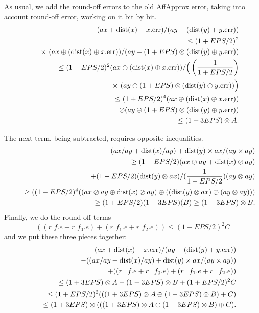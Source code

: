 As usual, we add the round-off errors to the old AffApprox error, 
taking into account round-off error, working on it bit by bit.
\begin{eqnarray*}
 &&\hskip-16pt (ax + {\rm dist}(x) + x.{\rm err})/(ay - ({\rm dist}(y) + y.{\rm err}))\\
&&  \le (1 + EPS/2)^2 \\
&&\quad \times \ (ax \oplus ({\rm dist}(x)
\oplus x.{\rm err}))/
         (ay - (1 + EPS) \otimes ({\rm dist}(y) \oplus y.{\rm err}))\\
&&  \le (1 + EPS/2)^2 (ax \oplus ({\rm dist}(x) \oplus
x.{\rm err}))/
         \Big(\left({1 \over 1 + EPS/2}\right) \\
&&\quad\times \ (ay \ominus (1 + EPS) \otimes ({\rm dist}(y) \oplus y.{\rm err}))\Big)\\
&& \le (1 + EPS/2)^4 (ax
\oplus ({\rm dist}(x) \oplus x.{\rm err}))\\
&&\quad \oslash
         (ay \ominus (1 + EPS) \otimes ({\rm dist}(y) \oplus y.{\rm err}))\\
&& \le   (1 + 3EPS) \otimes A.
\end{eqnarray*}

The next term, being subtracted, requires opposite inequalities.
\begin{eqnarray*}
&&(ax/ay + {\rm dist}(x)/ay) + {\rm dist}(y) \times ax / (ay \times ay)\\
&&\quad \ge (1-EPS/2)(ax \oslash ay + {\rm
dist}(x)
\oslash ay) \\
&&\qquad +  (1-EPS/2) ({\rm dist}(y) \otimes ax )/ ({1 \over 1 - EPS/2})(ay \otimes ay)\\
&&\quad \ge ((1-EPS/2)^4 ((ax
\oslash ay \oplus {\rm dist}(x) \oslash ay) \oplus  (({\rm dist}(y) \otimes ax) \oslash (ay \otimes ay)))\\
&&\quad \ge (1 +
EPS/2)(1 - 3EPS) (B)  \ge (1 - 3EPS) \otimes B.\end{eqnarray*}
Finally, we do the round-off terms 
$$((r\_f.e + r\_f_0.e) + (r\_f_1.e + r\_f_2.e)) \le (1 + EPS/2)^2 C $$
and we put these three pieces together:
\begin{eqnarray*}
&&
(ax + {\rm dist}(x) + x.{\rm err})/(ay - ({\rm dist}(y) + y.{\rm err}))
\\
&&\qquad  - 
((ax/ay + {\rm dist}(x)/ay) + {\rm dist}(y) \times ax / (ay \times ay))\\
&&\qquad
+ ((r\_f.e + r\_f_0.e) + (r\_f_1.e + r\_f_2.e))
\\
&&\quad \le 
(1 + 3EPS) \otimes A - (1 - 3EPS) \otimes B + (1 + EPS/2)^2 C\\
&&\quad \le (1+EPS/2)^2 (
((1 + 3EPS) \otimes A \ominus (1 - 3EPS) \otimes B)
 + C
) \\
&&\quad \le (1+3EPS) \otimes (
((1 + 3EPS) \otimes A \ominus (1 - 3EPS) \otimes B)
 \oplus C
) . \\
\noalign{\vskip-36pt}
\end{eqnarray*}
\enddemo

